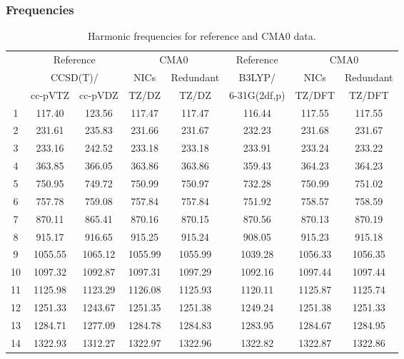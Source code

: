 \documentclass[10pt,oneside]{article}
\begin{document}
\begin{table}[h!]
\subsubsection*{Frequencies}
\centering
\caption{Harmonic frequencies for reference and CMA0 data.}
\begin{tabular}{cccccccc}
\toprule
{} & \multicolumn{2}{c}{Reference} & \multicolumn{2}{c}{CMA0} &    Reference & \multicolumn{2}{c}{CMA0} \\
{} & \multicolumn{2}{c}{CCSD(T)/} &    NICs &  Redundant &       B3LYP/ &    NICs & Redundant \\
{} &   cc-pVTZ & cc-pVDZ &   TZ/DZ &      TZ/DZ & 6-31G(2df,p) &  TZ/DFT &    TZ/DFT \\
\midrule
1  &    117.40 &  123.56 &  117.47 &     117.47 &       116.44 &  117.55 &    117.55 \\
2  &    231.61 &  235.83 &  231.66 &     231.67 &       232.23 &  231.68 &    231.67 \\
3  &    233.16 &  242.52 &  233.18 &     233.18 &       233.91 &  233.24 &    233.22 \\
4  &    363.85 &  366.05 &  363.86 &     363.86 &       359.43 &  364.23 &    364.23 \\
5  &    750.95 &  749.72 &  750.99 &     750.97 &       732.28 &  750.99 &    751.02 \\
6  &    757.78 &  759.08 &  757.84 &     757.84 &       751.92 &  758.57 &    758.59 \\
7  &    870.11 &  865.41 &  870.16 &     870.15 &       870.56 &  870.13 &    870.19 \\
8  &    915.17 &  916.65 &  915.25 &     915.24 &       908.05 &  915.23 &    915.18 \\
9  &   1055.55 & 1065.12 & 1055.99 &    1055.99 &      1039.28 & 1056.33 &   1056.35 \\
10 &   1097.32 & 1092.87 & 1097.31 &    1097.29 &      1092.16 & 1097.44 &   1097.44 \\
11 &   1125.98 & 1123.29 & 1126.08 &    1125.93 &      1120.11 & 1125.87 &   1125.74 \\
12 &   1251.33 & 1243.67 & 1251.35 &    1251.38 &      1249.24 & 1251.38 &   1251.33 \\
13 &   1284.71 & 1277.09 & 1284.78 &    1284.83 &      1283.95 & 1284.67 &   1284.95 \\
14 &   1322.93 & 1312.27 & 1322.97 &    1322.96 &      1322.82 & 1322.87 &   1322.86 \\

\end{tabular}
\end{table}
\end{document}
